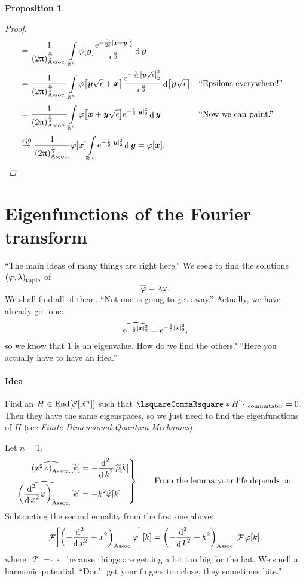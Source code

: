\documentclass[10pt]{article}
\newtheorem*{proposition}{Proposition}
\DeclarePairedDelimiter\singleBars{\lvert}{\rvert}
\DeclarePairedDelimiter\parentheses{\lparen}{\rparen}
\DeclarePairedDelimiter\squareBrackets{[}{]}
\newcommand\E{\mathrm{e}}
\DeclareMathOperator{\diffd}{d}
\DeclareMathOperator{\FT}{\mathcal{F}}
\DeclareMathOperator{\End}{End}
\newcommand\ft\widehat
\newcommand\deriv[3][]{\frac{\diffd^{#1} {#3}}{{\diffd {#2}}^{#1}}}
\newcommand{\derivop}[2][]{\deriv[#1]{#2}{}}
\newcommand{\R}{\mathbb{R}}
\newcommand{\SchwartzSpace}{\mathcal{S}}
\newcommand\of[1]{\parentheses*{#1}}
\newcommand\pa[1]{\parentheses*{#1}}
\newcommand\tuple[1]{\parentheses*{#1}}
\newcommand\norm[1]{\singleBars*{#1}}
\newcommand\commutator[2]{\lsquareCommaRsquare*{#1}{#2}}
\newcommand\gl\lambda
\newcommand\gj\varphi
\renewcommand\ge\epsilon
\newcommand{\vx}{{\vectorsym x}}
\newcommand{\vy}{{\vectorsym y}}
\newcommand\placeholder{\,\:\cdot\:\,}
\renewcommand\pa[1]{\parentheses*{#1}_\mathrm{Assoc.}}
\renewcommand\of[1]{\squareBrackets*{#1}}
\renewcommand\norm[1]{\singleBars*{#1}_{2}}
\renewcommand\tuple[1]{\parentheses*{#1}_{\mathrm{tuple}}}
\renewcommand\commutator[2]{\lsquareCommaRsquare*{#1}{#2}_{\mathrm{commutator}}}
\newcommand{\Rn}{{\R^n}}
\newcommand{\Schwartz}{{\SchwartzSpace\of{\Rn}}}
\newcommand{\ftnrm}{\frac{1}{\pa{2\Pi}^\frac{n}{2}} }
\begin{document}
\begin{proposition}
\begin{proof}
\begin{align*}
        &=\ftnrm\int\Rn\gj\of\vy\frac{\E^{-\frac{1}{2\ge}\norm{\vx-\vy}^2}}
        {\ge^\frac{n}{2}}\diffd\vy \\
        &=\ftnrm\int\Rn\gj\of{\vy\sqrt\ge+\vx}\frac{\E^{-\frac{1}{2\ge}\norm{\vy\sqrt\ge}^2}}
        {\ge^\frac{n}{2}}\diffd\of{\vy\sqrt\ge} && \text{``Epsilons everywhere!''}\\    
        &=\ftnrm\int\Rn\gj\of{\vx+\vy\sqrt\ge}\E^{-\frac{1}{2}\norm\vy^2}\diffd\vy
        && \text{``Now we can paint.''}\\
        &\overset{\ge\downarrow 0}{\rightarrow}
        \ftnrm\gj\of\vx\int\Rn\E^{-\frac{1}{2}\norm\vy^2}\diffd\vy =\gj\of\vx.
      \end{align*}
    \end{proof}
  \end{proposition}
  
  \section{Eigenfunctions of the Fourier transform}
  ``The main ideas of many things are right here.''
  We seek to find the solutions $\tuple{\gj,\gl}$ of
  \begin{equation*}
    \ft\gj=\gl\gj .
  \end{equation*}
  We shall find all of them. ``Not one is going to get away.'' Actually, we have already got one:
  \begin{equation*}
    \ft{\E^{-\frac{1}{2}\norm\vx^2}}=\E^{-\frac{1}{2}\norm\vx^2},
  \end{equation*}
  so we know that 1 is an eigenvalue. How do we find the others? ``Here you actually have to have an idea.''
  
  \paragraph{Idea}
  Find an $H\in\End\of\Schwartz$ such that $\commutator H {\ft\placeholder} = 0$. Then they have the same eigenspaces, so we just need to find the eigenfunctions of $H$ (see \emph{Finite Dimensional Quantum Mechanics}).
  
  Let $n=1$.
  \begin{equation*}
    \left.
    \begin{aligned}
      \ft{\pa{x^2\gj}}\of k &= -\derivop[2]{k}\ft\gj\of k \\
      \ft{\pa{\derivop[2]{x}\gj}}\of k &= -k^2 \ft\gj\of k
    \end{aligned}
    \right\rbrace \qquad \text{From the lemma your life depends on.}
  \end{equation*}
  Subtracting the second equality from the first one above:
  \begin{equation*}
    \FT\of{\pa{-\derivop[2]{x}+x^2}\gj}\of k = \pa{-\derivop[2]{k}+k^2}\FT\gj\of k,
  \end{equation*}
  where $\FT = \ft\placeholder$ because things are getting a bit too big for the hat.
  We smell a harmonic potential. ``Don't get your fingers too close, they sometimes bite.''
  
\end{document}
